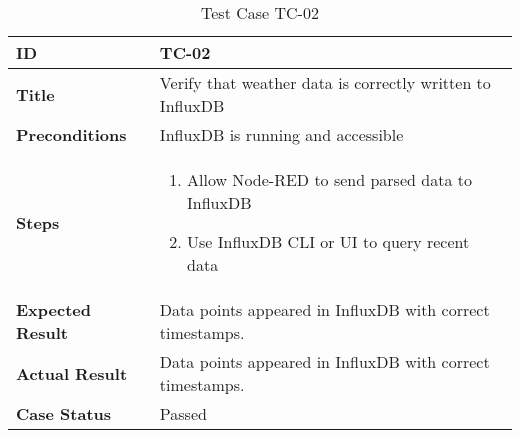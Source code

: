 \begin{table}[ht]
\centering
\begin{tabular}{|>{\raggedright\arraybackslash}p{4cm}|p{10cm}|}
\hline
\textbf{ID} & TC-02 \\
\hline
\textbf{Title} & Verify that weather data is correctly written to InfluxDB \\
\hline
\textbf{Preconditions} & InfluxDB is running and accessible \\
\hline
\textbf{Steps} & \vspace{-20pt}
\begin{enumerate}
    \item Allow Node-RED to send parsed data to InfluxDB
    \item Use InfluxDB CLI or UI to query recent data
\end{enumerate} \\
\hline
\textbf{Expected Result} & Data points appeared in InfluxDB with correct timestamps. \\
\hline
\textbf{Actual Result} & Data points appeared in InfluxDB with correct timestamps. \\
\hline
\textbf{Case Status} & Passed \\
\hline
\end{tabular}
\caption{Test Case TC-02}
\label{tab:tc2}
\end{table}